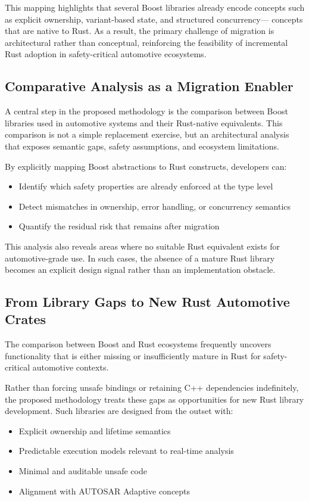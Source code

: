         This mapping highlights that several Boost libraries already encode concepts
        such as explicit ownership, variant-based state, and structured concurrency—
        concepts that are native to Rust. As a result, the primary challenge of
        migration is architectural rather than conceptual, reinforcing the feasibility
        of incremental Rust adoption in safety-critical automotive ecosystems.

        \subsection{Comparative Analysis as a Migration Enabler}

        A central step in the proposed methodology is the comparison between Boost
        libraries used in automotive systems and their Rust-native equivalents. This
        comparison is not a simple replacement exercise, but an architectural analysis
        that exposes semantic gaps, safety assumptions, and ecosystem limitations.

        By explicitly mapping Boost abstractions to Rust constructs, developers can:
        \begin{itemize}
        \item Identify which safety properties are already enforced at the type level
        \item Detect mismatches in ownership, error handling, or concurrency semantics
        \item Quantify the residual risk that remains after migration
        \end{itemize}

        This analysis also reveals areas where no suitable Rust equivalent exists for
        automotive-grade use. In such cases, the absence of a mature Rust library becomes
        an explicit design signal rather than an implementation obstacle.

        \subsection{From Library Gaps to New Rust Automotive Crates}
        \label{subsec:NewRustLibraries}

        The comparison between Boost and Rust ecosystems frequently uncovers
        functionality that is either missing or insufficiently mature in Rust for
        safety-critical automotive contexts.

        Rather than forcing unsafe bindings or retaining C++ dependencies indefinitely,
        the proposed methodology treats these gaps as opportunities for new Rust library
        development. Such libraries are designed from the outset with:
        \begin{itemize}
        \item Explicit ownership and lifetime semantics
        \item Predictable execution models relevant to real-time analysis
        \item Minimal and auditable unsafe code
        \item Alignment with AUTOSAR Adaptive concepts
        \end{itemize}

